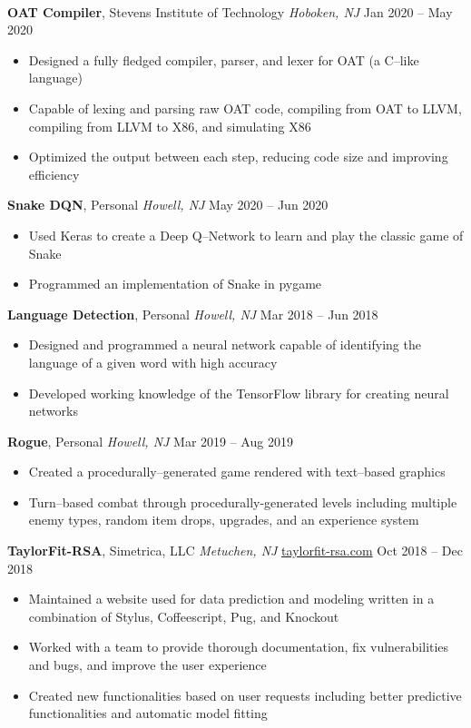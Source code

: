 \documentclass[10pt,letterpaper,roman]{moderncv}
\newcommand*{\mysection}[1]{%
  \vspace{2.5ex}
  \phantomsection{}
  \addcontentsline{toc}{part}{#1}%
  \parbox[m]{\textwidth}{\sectionstyle{#1}}\\[1ex]}
\begin{document}
\mysection{Projects}
\textbf{OAT Compiler}, Stevens Institute of Technology \textit{Hoboken, NJ} \hfill Jan 2020 -- May 2020
\begin{itemize}
	\item Designed a fully fledged compiler, parser, and lexer for OAT (a C--like language)
	\item Capable of lexing and parsing raw OAT code, compiling from OAT to LLVM, compiling from LLVM to X86, and simulating X86
	\item Optimized the output between each step, reducing code size and improving efficiency
\end{itemize}

\hfill

\textbf{Snake DQN}, Personal \textit{Howell, NJ} \hfill May 2020 -- Jun 2020
\begin{itemize}
	\item Used Keras to create a Deep Q--Network to learn and play the classic game of Snake
	\item Programmed an implementation of Snake in pygame
\end{itemize}

\hfill

\textbf{Language Detection}, Personal \textit{Howell, NJ} \hfill Mar 2018 -- Jun 2018
\begin{itemize}
	\item Designed and programmed a neural network capable of identifying the language of a given word with high accuracy
	\item Developed working knowledge of the TensorFlow library for creating neural networks
\end{itemize}

\hfill

\textbf{Rogue}, Personal \textit{Howell, NJ} \hfill Mar 2019 -- Aug 2019
\begin{itemize}
	\item Created a procedurally--generated game rendered with text--based graphics
	\item Turn--based combat through procedurally-generated levels including multiple enemy types, random item drops, upgrades, and an experience system
\end{itemize}

\hfill

\textbf{TaylorFit-RSA}, Simetrica, LLC \textit{Metuchen, NJ}  \hfill { \color{blue} \href{http://www.taylorfit-rsa.com/}{taylorfit-rsa.com} } Oct 2018 -- Dec 2018
\begin{itemize}
	\item Maintained a website used for data prediction and modeling written in a combination of Stylus, Coffeescript, Pug, and Knockout
	\item Worked with a team to provide thorough documentation, fix vulnerabilities and bugs, and improve the user experience
	\item Created new functionalities based on user requests including better predictive functionalities and automatic model fitting
	
\end{itemize}
\end{document}
